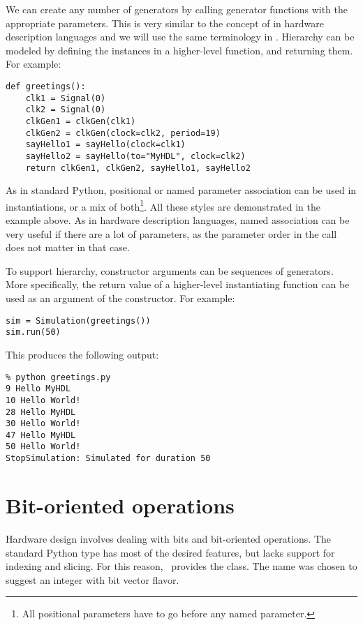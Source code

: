 We can create any number of generators by calling generator functions
with the appropriate parameters. This is very similar to the concept of
 in hardware description languages and we will use
the same terminology in \myhdl{}. Hierarchy can be modeled by defining
the instances in a higher-level function, and returning them. For
example: 

\begin{verbatim}
def greetings():
    clk1 = Signal(0)
    clk2 = Signal(0)
    clkGen1 = clkGen(clk1)
    clkGen2 = clkGen(clock=clk2, period=19)
    sayHello1 = sayHello(clock=clk1)
    sayHello2 = sayHello(to="MyHDL", clock=clk2)
    return clkGen1, clkGen2, sayHello1, sayHello2
\end{verbatim}

As in standard Python, positional or named parameter association can
be used in instantiations, or a mix of both\footnote{All positional
parameters have to go before any named parameter.}. All these styles
are demonstrated in the example above. As in hardware description
languages, named association can be very useful if there are a lot of
parameters, as the parameter order in the call does not matter in that
case.

To support hierarchy,  constructor arguments can be
sequences of generators. More specifically, the return value of a
higher-level instantiating function can be used as an argument of the
constructor. For example:

\begin{verbatim}
sim = Simulation(greetings())
sim.run(50)
\end{verbatim}

This produces the following output:

\begin{verbatim}
% python greetings.py
9 Hello MyHDL
10 Hello World!
28 Hello MyHDL
30 Hello World!
47 Hello MyHDL
50 Hello World!
StopSimulation: Simulated for duration 50
\end{verbatim}


\section{Bit-oriented operations}

Hardware design involves dealing with bits and bit-oriented
operations. The standard Python type  has most of the
desired features, but lacks support for indexing and slicing. For this
reason, \myhdl\ provides the  class. The name was chosen
to suggest an integer with bit vector flavor.


